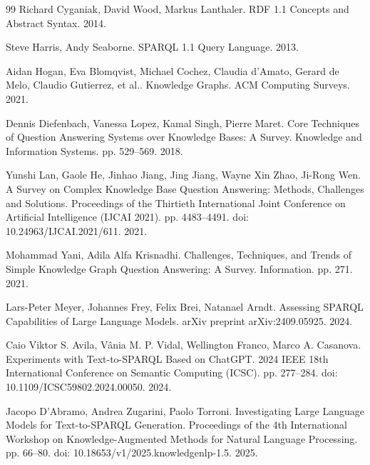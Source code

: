 \documentclass[
  12pt,
  english,
  oneside]{report}
\begin{document}
\clearpage
\renewcommand{\bibname}{References}
\begingroup
\small
\raggedright
\sloppy
\setlength{\parskip}{2pt}
\begin{thebibliography}{99}
Richard Cyganiak, David Wood, Markus Lanthaler. {RDF} 1.1 Concepts and Abstract Syntax. 2014.

Steve Harris, Andy Seaborne. {SPARQL} 1.1 Query Language. 2013.

Aidan Hogan, Eva Blomqvist, Michael Cochez, Claudia d'Amato, Gerard de Melo, Claudio Gutierrez, et al.. Knowledge Graphs. ACM Computing Surveys. 2021.

Dennis Diefenbach, Vanessa Lopez, Kamal Singh, Pierre Maret. Core Techniques of Question Answering Systems over Knowledge Bases: A Survey. Knowledge and Information Systems. pp. 529--569. 2018.

Yunshi Lan, Gaole He, Jinhao Jiang, Jing Jiang, Wayne Xin Zhao, Ji-Rong Wen. A Survey on Complex Knowledge Base Question Answering: Methods, Challenges and Solutions. Proceedings of the Thirtieth International Joint Conference on Artificial Intelligence (IJCAI 2021). pp. 4483--4491. doi: 10.24963/IJCAI.2021/611. 2021.

Mohammad Yani, Adila Alfa Krisnadhi. Challenges, Techniques, and Trends of Simple Knowledge Graph Question Answering: A Survey. Information. pp. 271. 2021.

Lars-Peter Meyer, Johannes Frey, Felix Brei, Natanael Arndt. Assessing {SPARQL} Capabilities of Large Language Models. arXiv preprint arXiv:2409.05925. 2024.

Caio Viktor S. Avila, V\^ania M. P. Vidal, Wellington Franco, Marco A. Casanova. Experiments with Text-to-{SPARQL} Based on {ChatGPT}. 2024 IEEE 18th International Conference on Semantic Computing (ICSC). pp. 277--284. doi: 10.1109/ICSC59802.2024.00050. 2024.

Jacopo D'Abramo, Andrea Zugarini, Paolo Torroni. Investigating Large Language Models for Text-to-{SPARQL} Generation. Proceedings of the 4th International Workshop on Knowledge-Augmented Methods for Natural Language Processing. pp. 66--80. doi: 10.18653/v1/2025.knowledgenlp-1.5. 2025.


\end{thebibliography}
\end{document}
